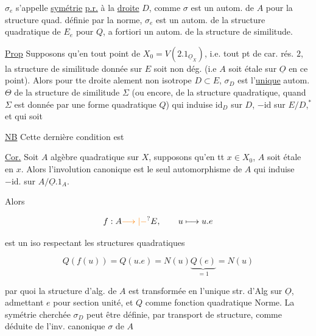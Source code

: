 
 $\sigma_e$ s'appelle \uline{symétrie} \uline{p.r.} à la \uline{droite} $D$, comme $\sigma$ est un autom. de $A$ pour la structure quad. définie par la norme, $\sigma_e$ est un autom. de la structure quadratique de $E_e$ pour $Q$, a fortiori un autom. de la structure de similitude.

\uline{Prop} Supposons qu'en tout point de $X_0=V(2.1_{\underline O_X})$, i.e. tout pt de car. rés. $2$, la structure de similitude donnée sur $E$ soit non dég. (i.e $A$ soit étale sur $\underline O$ en ce point). Alors pour tte droite alement non isotrope $D\subset E$, $\sigma_D$ est l'\uline{unique} autom. $\Theta$ de la structure de similitude $\Sigma$ (ou encore, de la structure quadratique, quand $\Sigma$ est donnée par une forme quadratique $Q$)  qui induise $\mathrm{id}_D$ sur $D$, $-\mathrm{id}$ sur $E/D$,$^*$ et qui  soit    


\uline{NB} Cette dernière condition   est 

\uline{Cor.} Soit $A$ algèbre quadratique sur $X$, supposons qu'en tt $x\in X_0$, $A$ soit étale en $x$. Alors l'involution canonique est le seul automorphisme  de $A$ qui induise $-\mathrm{id}.$ sur $A/\underline O.1_A$.


Alors

\[
f: A\unsure{\longrightarrow|\mathbin{-}} E,\qquad u\longmapsto u.e
\]

est un iso respectant les structures quadratiques

\[
Q(f(u))=Q(u.e)=N(u)\underbrace{Q(e)}_{=1}=N(u)
\]


par quoi la structure d'alg. de $A$ est transformée en l'unique str. d'Alg  sur $\underline O$, admettant $e$ pour section unité, et $Q$ comme fonction quadratique Norme. La symétrie cherchée $\sigma_D$ peut être définie, par transport de structure, comme déduite de l'inv. canonique $\sigma$ de $A$

